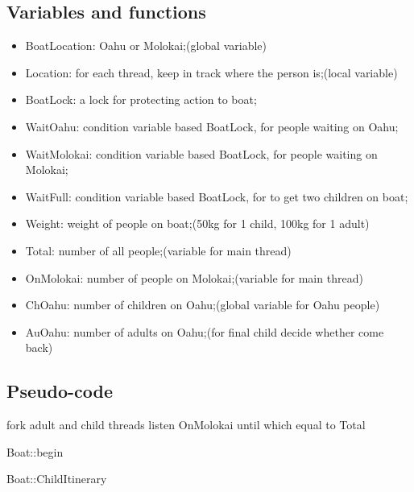 \documentclass[a4paper,10pt]{article}
\begin{document}
\subsection{Variables and functions}
\begin{itemize}
\item BoatLocation: Oahu or Molokai;(global variable)
\item Location: for each thread, keep in track where the person is;(local variable)
\item BoatLock: a lock for protecting action to boat;
\item WaitOahu: condition variable based BoatLock, for people waiting on Oahu;
\item WaitMolokai: condition variable based BoatLock, for people waiting on Molokai;
\item WaitFull: condition variable based BoatLock, for to get two children on boat;
\item Weight: weight of people on boat;(50kg for 1 child, 100kg for 1 adult)
\item Total: number of all people;(variable for main thread)
\item OnMolokai: number of people on Molokai;(variable for main thread)
\item ChOahu: number of children on Oahu;(global variable for Oahu people)
\item AuOahu: number of adults on Oahu;(for final child decide whether come back)
\end{itemize}
\subsection {Pseudo-code}
\begin{algorithm}
\DontPrintSemicolon %
fork adult and child threads\;
listen OnMolokai until which equal to Total\;
\caption{Boat::begin}
\label{algo:change}
\end{algorithm}
\begin{algorithm}
\DontPrintSemicolon %
\caption{Boat::ChildItinerary}
\label{algo:change}
\end{algorithm}
\end{document}
